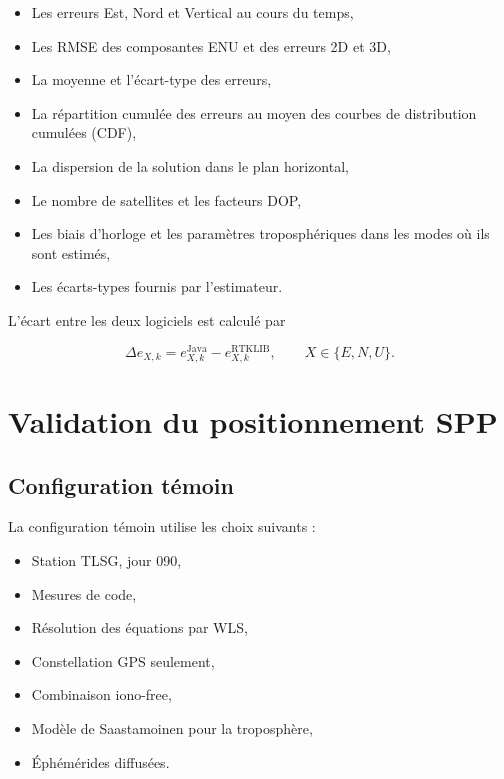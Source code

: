 \begin{itemize}
    \item Les erreurs Est, Nord et Vertical au cours du temps,
    \item Les RMSE des composantes ENU et des erreurs 2D et 3D,
    \item La moyenne et l'écart-type des erreurs,
    \item La répartition cumulée des erreurs au moyen des courbes de distribution cumulées (CDF),
    \item La dispersion de la solution dans le plan horizontal,
    \item Le nombre de satellites et les facteurs DOP,
    \item Les biais d'horloge et les paramètres troposphériques dans les modes
    où ils sont estimés,
    \item Les écarts-types fournis par l'estimateur.
\end{itemize}

L'écart entre les deux logiciels est calculé par

\begin{equation}
\Delta e_{X,k}=e_{X,k}^{\mathrm{Java}}-e_{X,k}^{\mathrm{RTKLIB}},
\qquad X\in\{E,N,U\}.
\label{eq:validation_java_rtklib_delta}
\end{equation}

\section{Validation du positionnement SPP}
\label{sec:validation_spp}

\subsection{Configuration témoin}

La configuration témoin utilise les choix suivants :

\begin{itemize}
    \item Station TLSG, jour 090,
    \item Mesures de code,
    \item Résolution des équations par WLS,
    \item Constellation GPS seulement,
    \item Combinaison iono-free,
    \item Modèle de Saastamoinen pour la troposphère,
    \item Éphémérides diffusées.
\end{itemize}

